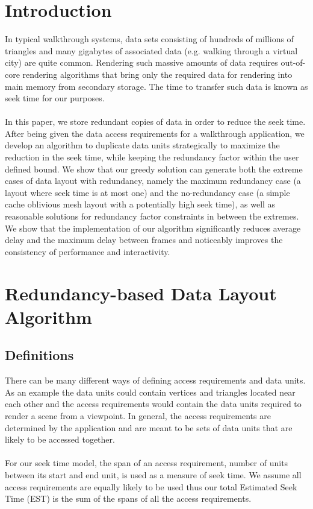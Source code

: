 
\section{Introduction}

In typical walkthrough systems, data sets consisting of hundreds of millions of
triangles and many gigabytes of associated data (e.g. walking through a virtual
city) are quite common. Rendering such massive amounts of data requires
out-of-core rendering algorithms that bring only the required data for
rendering into main memory from secondary storage. The time to transfer such data
is known as seek time for our purposes. \\
\\
In this paper, we store redundant
copies of data in order to reduce the seek time. After being given
the data access requirements for a walkthrough application, we develop
an algorithm to duplicate data units strategically to maximize the reduction
in the seek time, while keeping the redundancy factor within the user defined
bound. We show that our greedy solution can generate both the extreme cases
of data layout with redundancy, namely the maximum redundancy case
(a layout where seek time is at most one) and the no-redundancy case (a simple
cache oblivious mesh layout with a potentially high seek time), as well as
reasonable solutions for redundancy factor constraints in between the extremes.
We show that the
implementation of our algorithm significantly reduces average delay and the maximum delay between
frames and noticeably improves the consistency of performance and
interactivity.

\section{Redundancy-based Data Layout Algorithm}

\subsection{Definitions}

There can be many different ways of defining access requirements and data
units. As an example the data units could contain vertices and triangles located near each other and the access requirements would contain the data units required to render a scene from a viewpoint. In general,
the access requirements are determined by the application and are meant to be
sets of data units that are likely to be accessed together. \\
\\
For our seek time model, the
span of an access requirement, number of units between its start and end unit, is used as a measure of seek time.
 We assume all access requirements are equally likely to be used thus 
our total Estimated Seek Time (EST) is the sum of the spans of all the access requirements. 


